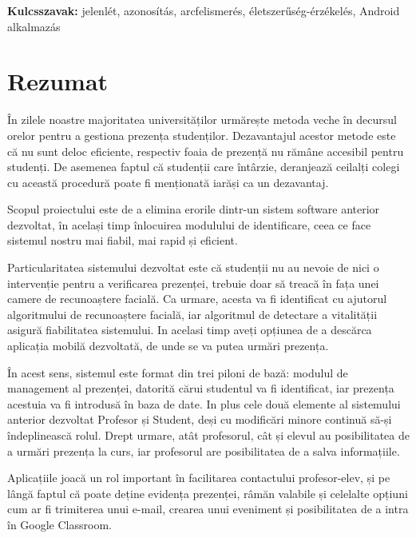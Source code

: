 \vspace*{2cm}

\noindent \textbf{Kulcsszavak:} jelenlét, azonosítás, arcfelismerés, életszerűség-érzékelés, Android alkalmazás
\vfill
{}

\chapter*{Rezumat}

În zilele noastre majoritatea universităților urmărește metoda veche în decursul orelor pentru a gestiona prezența studenților. Dezavantajul acestor metode este că nu sunt deloc eficiente, respectiv foaia de prezență nu rămâne accesibil pentru studenți. De asemenea faptul că studenții care întârzie, deranjează ceilalți colegi cu această procedură poate fi menționată iarăși ca un dezavantaj.

Scopul proiectului este de a elimina erorile dintr-un sistem software anterior dezvoltat, în același timp înlocuirea modulului de identificare, ceea ce face sistemul nostru mai fiabil, mai rapid și eficient. 

Particularitatea sistemului dezvoltat este că studenții nu au nevoie de nici o intervenție pentru a verificarea prezenței, trebuie doar să treacă în fața unei camere de recunoaștere facială. Ca urmare, acesta va fi identificat cu ajutorul algoritmului de recunoaștere facială, iar algoritmul de detectare a vitalității asigură fiabilitatea sistemului. In acelasi timp aveți opțiunea de a descărca aplicația mobilă dezvoltată, de unde se va putea urmări prezența.

În acest sens, sistemul este format din trei piloni de bază: modulul de management al prezenței, datorită cărui studentul va fi identificat, iar prezența acestuia va fi introdusă în baza de date. In plus
cele două elemente al sistemului anterior dezvoltat  Profesor și Student, deși cu modificări minore continuă să-și îndeplinească rolul. Drept urmare, atât profesorul, cât și elevul au posibilitatea de a  urmări prezența la curs, iar profesorul are posibilitatea de a salva informațiile. 

Aplicațiile joacă un rol important în facilitarea contactului profesor-elev, și pe lângă faptul că  poate deține evidența prezenței, râmăn valabile și celelalte opțiuni cum ar fi trimiterea unui e-mail, crearea unui eveniment și posibilitatea de a intra în Google Classroom.

